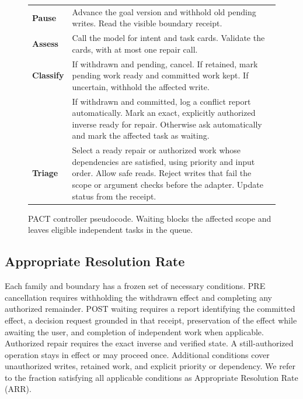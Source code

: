 \documentclass[conference]{IEEEtran}
\begin{document}
\begin{figure}[t]
\centering
\small
\setlength{\tabcolsep}{3pt}
\renewcommand{\arraystretch}{1.15}
\begin{tabular}{@{}lp{}@{}}
\toprule
\textbf{Pause} & Advance the goal version and withhold old pending writes. Read the visible boundary receipt. \\
\textbf{Assess} & Call the model for intent and task cards. Validate the cards, with at most one repair call. \\
\textbf{Classify} & If withdrawn and pending, cancel. If retained, mark pending work ready and committed work kept. If uncertain, withhold the affected write. \\
& If withdrawn and committed, log a conflict report automatically. Mark an exact, explicitly authorized inverse ready for repair. Otherwise ask automatically and mark the affected task as waiting. \\
\textbf{Triage} & Select a ready repair or authorized work whose dependencies are satisfied, using priority and input order. Allow safe reads. Reject writes that fail the scope or argument checks before the adapter. Update status from the receipt. \\
\bottomrule
\end{tabular}
\caption{PACT controller pseudocode. Waiting blocks the affected scope and leaves eligible independent tasks in the queue.}
\label{fig:controller}
\end{figure}

\subsection{Appropriate Resolution Rate}
Each family and boundary has a frozen set of necessary conditions. PRE cancellation requires withholding the withdrawn effect and completing any authorized remainder. POST waiting requires a report identifying the committed effect, a decision request grounded in that receipt, preservation of the effect while awaiting the user, and completion of independent work when applicable. Authorized repair requires the exact inverse and verified state. A still-authorized operation stays in effect or may proceed once. Additional conditions cover unauthorized writes, retained work, and explicit priority or dependency. We refer to the fraction satisfying all applicable conditions as Appropriate Resolution Rate (ARR).
\end{document}
